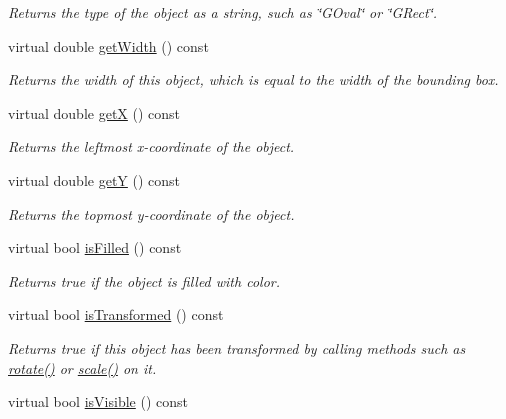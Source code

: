 \begin{DoxyCompactItemize}
\begin{DoxyCompactList}\small\item\em Returns the type of the object as a string, such as {\ttfamily \char`\"{}\+G\+Oval\char`\"{}} or {\ttfamily \char`\"{}\+G\+Rect\char`\"{}}. \end{DoxyCompactList}\item 
virtual double \mbox{\hyperlink{classGObject_a0ed2965abd4f5701d2cadf71239faf19}{get\+Width}} () const
\begin{DoxyCompactList}\small\item\em Returns the width of this object, which is equal to the width of the bounding box. \end{DoxyCompactList}\item 
virtual double \mbox{\hyperlink{classGObject_a344385751bee0720059403940d57a13e}{getX}} () const
\begin{DoxyCompactList}\small\item\em Returns the leftmost {\itshape x}-\/coordinate of the object. \end{DoxyCompactList}\item 
virtual double \mbox{\hyperlink{classGObject_aafa51c7f8f38a09febbb9ce7853f77b4}{getY}} () const
\begin{DoxyCompactList}\small\item\em Returns the topmost {\itshape y}-\/coordinate of the object. \end{DoxyCompactList}\item 
virtual bool \mbox{\hyperlink{classGObject_a11c404f106940c201b6f326e0355c150}{is\+Filled}} () const
\begin{DoxyCompactList}\small\item\em Returns {\ttfamily true} if the object is filled with color. \end{DoxyCompactList}\item 
virtual bool \mbox{\hyperlink{classGObject_a9de207581cfa4ca1eaa06da5f29b75fc}{is\+Transformed}} () const
\begin{DoxyCompactList}\small\item\em Returns {\ttfamily true} if this object has been transformed by calling methods such as \mbox{\hyperlink{classGObject_ae1ffaa12185dfd5ba464f7d87c329e26}{rotate()}} or \mbox{\hyperlink{classGObject_ad2e1900f730475c2d044817db03b38d6}{scale()}} on it. \end{DoxyCompactList}\item 
virtual bool \mbox{\hyperlink{classGObject_a9d8a6cfb13917785c143e74d40e4e2be}{is\+Visible}} () const

\end{DoxyCompactItemize}
